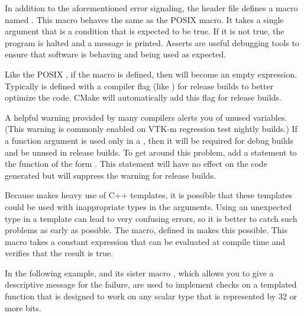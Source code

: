In addition to the aforementioned error signaling, the
 header file defines a macro named
. This macro behaves the same as the POSIX
 macro. It takes a single argument that is a condition
that is expected to be true. If it is not true, the program is halted and a
message is printed. Asserts are useful debugging tools to ensure that
software is behaving and being used as expected.


\begin{didyouknow}
  Like the POSIX , if the  macro is
  defined, then  will become an empty expression.
  Typically  is defined with a compiler flag (like
  ) for release builds to better optimize the code.
  CMake will automatically add this flag for release builds.
\end{didyouknow}

\begin{commonerrors}
  A helpful warning provided by many compilers alerts you of unused
  variables. (This warning is commonly enabled on VTK-m regression test
  nightly builds.) If a function argument is used only in a
  , then it will be required for debug builds and
  be unused in release builds. To get around this problem, add a statement
  to the function of the form . This
  statement will have no effect on the code generated but will suppress the
  warning for release builds.
\end{commonerrors}


Because \VTKm makes heavy use of C++ templates, it is possible that these templates could be used with inappropriate types in the arguments.
Using an unexpected type in a template can lead to very confusing errors, so it is better to catch such problems as early as possible.
The  macro, defined in  makes this possible.
This macro takes a constant expression that can be evaluated at compile time and verifies that the result is true.

In the following example,  and its sister macro , which allows you to give a descriptive message for the failure, are used to implement checks on a templated function that is designed to work on any scalar type that is represented by 32 or more bits.

